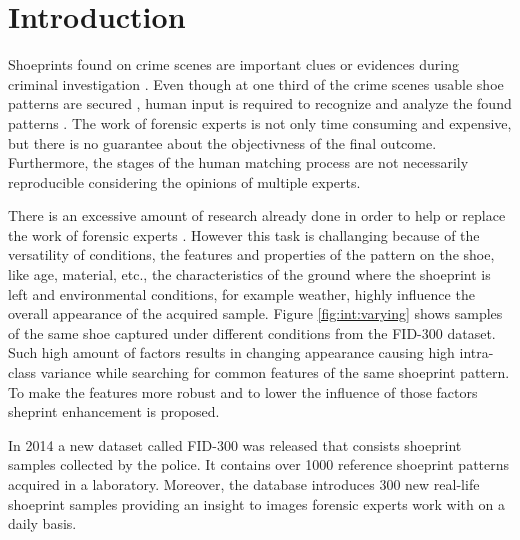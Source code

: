 \documentclass[draft,final]{vutinfth} %
\begin{document}

\tableofcontents %

\mainmatter

\chapter{Introduction}

\par
Shoeprints found on crime scenes are important clues or evidences during criminal investigation \cite{kong2014novel}.
Even though at one third of the crime scenes usable shoe patterns are secured \cite{alexandre1996computerized}, human input is required to recognize and analyze the found patterns  \cite{wang2014automatic}.
The work of forensic experts is not only time consuming and expensive, but there is no guarantee about the objectivness of the final outcome\cite{gueham2008automatic}.
Furthermore, the stages of the human matching process are not necessarily reproducible considering the opinions of multiple experts.
\par
There is an excessive amount of research already done in order to help or replace the work of forensic experts \cite{rida2019forensic}.
However this task is challanging because of the versatility of conditions, the features and properties of the pattern on the shoe, like age, material, etc., the characteristics of the ground where the shoeprint is left and environmental conditions, for example weather, highly influence the overall appearance of the acquired sample.
Figure \ref{fig:int:varying} shows samples of the same shoe captured under different conditions from the FID-300 \cite{kortylewski2014unsupervised} dataset.
Such high amount of factors results in changing appearance causing high intra-class variance while searching for common features of the same shoeprint pattern.
To make the features more robust and to lower the influence of those factors sheprint enhancement is proposed.
\par
In 2014 a new dataset called FID-300 \cite{kortylewski2014unsupervised} was released that consists shoeprint samples collected by the police. 
It contains over 1000 reference shoeprint patterns acquired in a laboratory.
Moreover, the database introduces 300 new real-life shoeprint samples providing an insight to images forensic experts work with on a daily basis.
\end{document}
